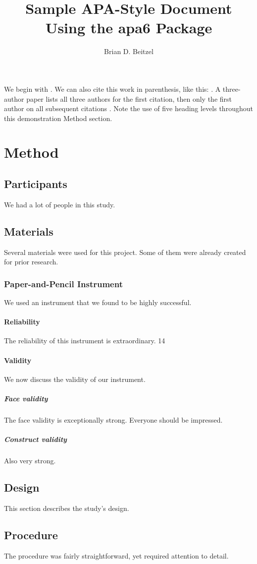 \documentclass[jou]{apa6}
\title{Sample APA-Style Document Using the \textsf{apa6} Package}
\author{Brian D. Beitzel}
\affiliation{SUNY Oneonta}
\begin{document}
\maketitle
We begin with \textcite{Shotton1989}. We can also cite this work in
parenthesis, like this: \parencite{Shotton1989}.
A three-author paper \parencite[e.g.,][]{Lassen2006} lists all
three authors for the first citation, then only the first author
on all subsequent citations \parencite{Lassen2006}.
Note the use of five heading levels throughout this demonstration
Method section.
\section{Method}
\subsection{Participants}
We had a lot of people in this study.
\subsection{Materials}
Several materials were used for this project. Some of them were
already created for prior research.
\subsubsection{Paper-and-Pencil Instrument}
We used an instrument that we found to be highly successful.
\paragraph{Reliability}
The reliability of this instrument is extraordinary.
14
\paragraph{Validity}
We now discuss the validity of our instrument.
\subparagraph{Face validity} The face validity is exceptionally
strong. Everyone should be impressed.
\subparagraph{Construct validity} Also very strong.
\subsection{Design}
This section describes the study’s design.
\subsection{Procedure}
The procedure was fairly straightforward, yet required
attention to detail.
\end{document}
